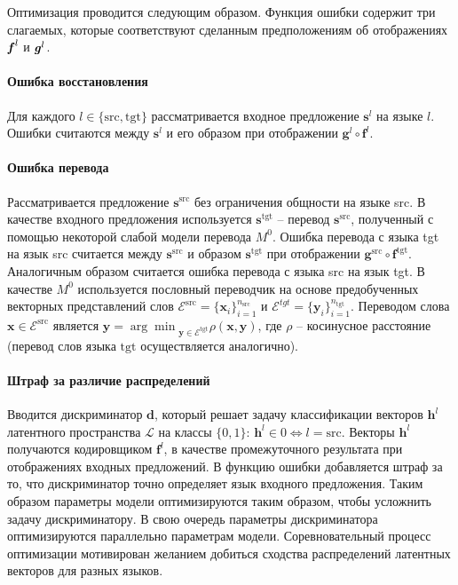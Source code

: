 \documentclass[12pt,twoside]{article}
\begin{document}
Оптимизация проводится следующим образом. Функция ошибки содержит три слагаемых, которые соответствуют сделанным предположениям об отображениях $\textbf{\textit{f}}^{l}$ и $\textbf{\textit{g}}^{l}$.
\paragraph{Ошибка восстановления} Для каждого $l \in \{\text{src}, \text{tgt}\}$ рассматривается входное предложение $\mathbf{s}^{l}$ на языке $l$. Ошибки считаются между $\mathbf{s}^{l}$ и его образом при отображении $\textbf{g}^{l} \circ \textbf{f}^{l}$.

\paragraph{Ошибка перевода} Рассматривается предложение $\mathbf{s}^{\text{src}}$ без ограничения общности на языке src. В качестве входного предложения используется $\mathbf{s}^{\text{tgt}}$ -- перевод $\mathbf{s}^{\text{src}}$, полученный с помощью некоторой слабой модели перевода $M^0$. Ошибка перевода с языка tgt на язык src считается между $\mathbf{s}^{\text{src}}$ и образом $\mathbf{s}^{\text{tgt}}$ при отображении $\textbf{g}^{\text{src}} \circ \textbf{f}^{\text{tgt}}$. Аналогичным образом считается ошибка перевода с языка src на язык tgt. В качестве $M^0$ используется пословный переводчик на основе предобученных векторных представлений слов $\mathcal{E}^{\text{src}} = \{\textbf{x}_i\}_{i=1}^{n_{\text{src}}}$ и $\mathcal{E}^{tgt} = \{\textbf{y}_i\}_{i=1}^{n_{\text{tgt}}}$. Переводом слова $\textbf{x} \in \mathcal{E}^{\text{src}}$ является $\textbf{y} = {\arg\min}_{\textbf{y} \in  \mathcal{E}^{\text{tgt}}} \rho(\textbf{x}, \textbf{y})$, где $\rho$ -- косинусное расстояние (перевод слов языка $\text{tgt}$ осуществляется аналогично).

\paragraph{Штраф за различие распределений} Вводится дискриминатор $\textbf{d}$, который решает задачу классификации векторов $\textbf{h}^l$ латентного пространства $\mathcal{L}$ на классы $\{0, 1\}$: $\textbf{h}^l \in 0 \Leftrightarrow l = \text{src}$. Векторы $\textbf{h}^l$ получаются кодировщиком $\textbf{f}^{l}$, в качестве промежуточного результата при отображениях входных предложений. В функцию ошибки добавляется штраф за то, что дискриминатор точно определяет язык входного предложения. Таким образом параметры модели оптимизируются таким образом, чтобы усложнить задачу дискриминатору. В свою очередь параметры дискриминатора оптимизируются параллельно параметрам модели. Соревновательный процесс оптимизации мотивирован желанием добиться сходства распределений латентных векторов для разных языков.
\end{document}
